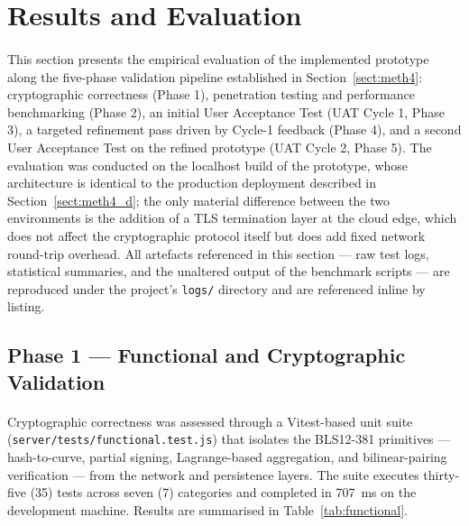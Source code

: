 \section{Results and Evaluation}
\label{header:results}

\paragraph{}This section presents the empirical evaluation of the implemented prototype along the five-phase validation pipeline established in Section~\ref{sect:meth4}: cryptographic correctness (Phase 1), penetration testing and performance benchmarking (Phase 2), an initial User Acceptance Test (UAT Cycle 1, Phase 3), a targeted refinement pass driven by Cycle-1 feedback (Phase 4), and a second User Acceptance Test on the refined prototype (UAT Cycle 2, Phase 5). The evaluation was conducted on the localhost build of the prototype, whose architecture is identical to the production deployment described in Section~\ref{sect:meth4_d}; the only material difference between the two environments is the addition of a TLS termination layer at the cloud edge, which does not affect the cryptographic protocol itself but does add fixed network round-trip overhead. All artefacts referenced in this section --- raw test logs, statistical summaries, and the unaltered output of the benchmark scripts --- are reproduced under the project's \texttt{logs/} directory and are referenced inline by listing.

\subsection{Phase 1 --- Functional and Cryptographic Validation}
\label{sect:results_func}

\paragraph{}Cryptographic correctness was assessed through a Vitest-based unit suite (\texttt{server/tests/functional.test.js}) that isolates the BLS12-381 primitives --- hash-to-curve, partial signing, Lagrange-based aggregation, and bilinear-pairing verification --- from the network and persistence layers. The suite executes thirty-five (35) tests across seven (7) categories and completed in 707~ms on the development machine. Results are summarised in Table~\ref{tab:functional}.

